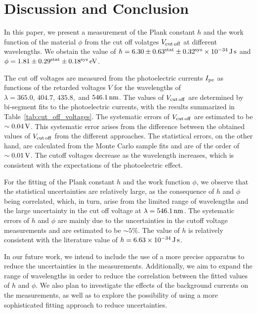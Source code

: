 \documentclass[aps,twocolumn,secnumarabic,balancelastpage,amsmath,amssymb,nofootinbib,floatfix]{revtex4-1}
\newcommand{\ev}{\,{\rm eV}}
\newcommand{\nm}{\,{\rm nm}}
\newcommand{\V}{\,{\rm V}}
\newcommand{\Js}{\,{\rm J}\,{\rm s}}
\begin{document}
\section{Discussion and Conclusion}
\label{sec:conclusion}

In this paper, we present a measurement of the Plank constant $h$ and the work function of the material $\phi$ from the cut off volatges $V_{\rm{cut\,off}}$ at different wavelengths. We obstain the value of $h = 6.30 \pm 0.63^{\rm{stat}} \pm 0.32^{\rm{sys}} \times 10^{-34}\Js$ and $\phi = 1.81 \pm 0.29^{\rm{stat}} \pm 0.18^{\rm{sys}}\ev$.

The cut off voltages are measured from the photoelectric currents $I_{\rm{pe}}$ as functions of the retarded voltages $V$ for the wavelengths of $\lambda = 365.0, \, 404.7, \, 435.8,$ and $546.1\nm$. The values of $V_{\rm{cut\,off}}$ are determined by bi-segment fits to the photoelectric currents, with the results summarized in Table~\ref{tab:cut_off_voltages}. The systematic errors of $V_{\rm{cut\,off}}$ are estimated to be $\sim 0.04\V$. This systematic error arises from the difference between the obtained values of $V_{\rm{cut\,off}}$ from the different approaches. The statistical errors, on the other hand, are calculated from the Monte Carlo sample fits and are of the order of $\sim 0.01\V$. The cutoff voltages decrease as the wavelength increases, which is consistent with the expectations of the photoelectric effect.

For the fitting of the Plank constant $h$ and the work function $\phi$, we observe that the statistical uncertainties are relatively large, as the consequence of $h$ and $\phi$ being correlated, which, in turn, arise from the limited range of wavelengths and the large uncertainty in the cut off voltage at $\lambda = 546.1\nm$. The systematic errors of $h$ and $\phi$ are mainly due to the uncertainties in the cutoff voltage measurements and are estimated to be $\sim 5\%$. The value of $h$ is relatively consistent with the literature value of $h = 6.63 \times 10^{-34}\Js$.

In our future work, we intend to include the use of a more precise apparatus to reduce the uncertainties in the measurements. Additionally, we aim to expand the range of wavelengths in order to reduce the correlation between the fitted values of $h$ and $\phi$. We also plan to investigate the effects of the background currents on the measurements, as well as to explore the possibility of using a more sophisticated fitting approach to reduce uncertainties.
\end{document}
